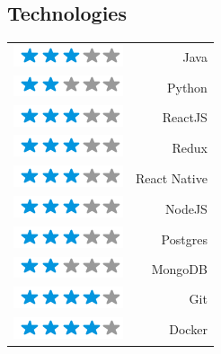 \documentclass{friggeri-cv}
\begin{document}
\begin{aside}
  \section{Technologies}
  \begin{tabular}{lr}
  \includegraphics[scale=0.3]{img/3stars.png} & Java \\ 
  \includegraphics[scale=0.3]{img/2stars.png} & Python \\
  \includegraphics[scale=0.3]{img/3stars.png} & ReactJS \\
  \includegraphics[scale=0.3]{img/3stars.png} & Redux \\
  \includegraphics[scale=0.3]{img/3stars.png} & React Native \\
  \includegraphics[scale=0.3]{img/3stars.png} & NodeJS \\
  \includegraphics[scale=0.3]{img/3stars.png} & Postgres \\
  \includegraphics[scale=0.3]{img/2stars.png} & MongoDB \\
  \includegraphics[scale=0.3]{img/4stars.png} & Git \\
  \includegraphics[scale=0.3]{img/4stars.png} & Docker \\
  \end{tabular}
    ~
\end{aside}
\end{document}
